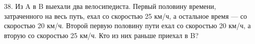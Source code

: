 38. Из A в B выехали два велосипедиста. Первый половину времени, затраченного на весь путь, ехал со скоростью 25 км/ч, а остальное время --- со скоростью 20 км/ч. Второй первую половину пути ехал со скоростью 20 км/ч, а вторую со скоростью 25 км/ч. Кто из них раньше приехал в B?\\
